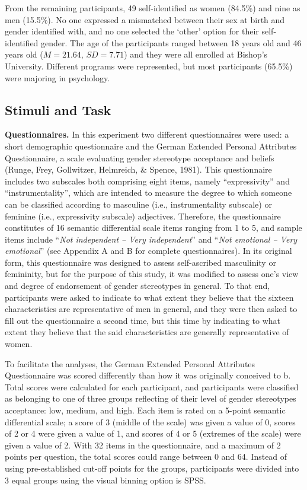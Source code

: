 \documentclass[authordate, serif, review]{jote-article}
\begin{document}
\begin{multicols}{2}
From the remaining participants, 49 self-identified as women (84.5\%) and nine as men (15.5\%). No one expressed a mismatched between their sex at birth and gender identified with, and no one selected the `other' option for their self-identified gender. The age of the participants ranged between 18 years old and 46 years old ($M = 21.64$, $SD = 7.71$) and they were all enrolled at Bishop's University. Different programs were represented, but most participants (65.5\%) were majoring in psychology.  

\subsection*{Stimuli and Task}
\textbf{Questionnaires.} In this experiment two different questionnaires were used: a short demographic questionnaire and the German Extended Personal Attributes Questionnaire, a scale evaluating gender stereotype acceptance and beliefs (Runge, Frey, Gollwitzer, Helmreich, \& Spence, 1981). This questionnaire includes two subscales both comprising eight items, namely ``expressivity'' and ``instrumentality'', which are intended to measure the degree to which someone can be classified according to masculine (i.e., instrumentality subscale) or feminine (i.e., expressivity subscale) adjectives. Therefore, the questionnaire constitutes of 16 semantic differential scale items ranging from 1 to 5, and sample items include ``\textit{Not independent -- Very independent}''  and ``\textit{Not emotional -- Very emotional}'' (see Appendix A and B for complete questionnaires). In its original form, this questionnaire was designed to assess self-ascribed masculinity or femininity, but for the purpose of this study, it was modified to assess one's view and degree of endorsement of gender stereotypes in general. To that end, participants were asked to indicate to what extent they believe that the sixteen characteristics are representative of men in general, and they were then asked to fill out the questionnaire a second time, but this time by indicating to what extent they believe that the said characteristics are generally representative of women.  

To facilitate the analyses, the German Extended Personal Attributes Questionnaire was scored differently than how it was originally conceived to b. Total scores were calculated for each participant, and participants were classified as belonging to one of three groups reflecting of their level of gender stereotypes acceptance: low, medium, and high. Each item is rated on a 5-point semantic differential scale; a score of 3 (middle of the scale) was given a value of 0, scores of 2 or 4 were given a value of 1, and scores of 4 or 5 (extremes of the scale) were given a value of 2. With 32 items in the questionnaire, and a maximum of 2 points per question, the total scores could range between 0 and 64. Instead of using pre-established cut-off points for the groups, participants were divided into 3 equal groups using the visual binning option is SPSS.  


\end{multicols}
\end{document}
